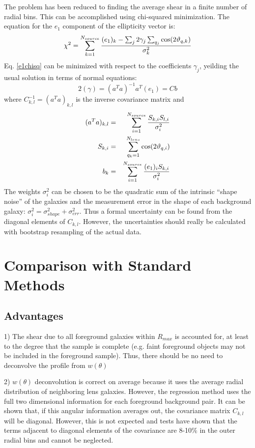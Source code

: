\documentclass[preprint2]{aastex}
\def\rmax{$R_{max}$ }
\begin{document}
The problem has been reduced to finding the average
shear in a finite number of radial bins.  This can be accomplished using
chi-squared minimization. The equation for the $e_1$ component of the ellipticity
vector is:
\begin{equation} \label{e1chisq}
\chi^{2} = \sum_{k=1}^{N_{source}}{(e_{1})_k - \sum_j2\gamma_j\sum_{q_j}\cos(2\vartheta_{q,k}) \over \sigma_k^{2}}
\end{equation}
Eq. \ref{e1chisq} can be minimized with respect to the coefficients
$\gamma_j$, yeilding the usual solution in terms of normal equations:
\begin{equation}
2(\gamma) = (a^{T}a)^{-1}a^{T}(e_{1}) = Cb
\end{equation}
where $C_{k,l}^{-1} = (a^{T}a)_{k,l}$ is the inverse covariance matrix and 
\begin{eqnarray}
(a^{T}a)_{k,l} & = & {\sum_{i=1}^{N_{source}}{S_{k,i}S_{l,i} \over
\sigma_{i}^{2} } } \nonumber \\
S_{k,i} & = & {\sum_{q_k=1}^{N_{lens}}\cos(2\vartheta_{q,i})}  \\
b_k & = & \sum_{i=1}^{N_{source}}{(e_{1})_{i}S_{k,i} \over \sigma_{i}^{2}} \nonumber
\end{eqnarray}
The weights $\sigma_{i}^{2}$ can be chosen to be the quadratic sum of the 
intrinsic ``shape noise'' of the galaxies and the measurement error in the 
shape of each background galaxy: 
$\sigma_{i}^{2} = \sigma_{shape}^{2} + \sigma_{err}^{2}$.
Thus a formal uncertainty can be found from the diagonal elements of
$C_{k,l}$.  However, the uncertainties should really be calculated with
bootstrap resampling of the actual data.

\section{Comparison with Standard Methods}
\subsection{Advantages}
1) The shear due to all foreground galaxies within \rmax is accounted for,
   at least to the degree that the sample is complete (e.g. faint foreground
   objects may not be included in the foreground sample).  Thus, there should 
   be no need to deconvolve the profile from $w(\theta)$

2) $w(\theta)$ deconvolution is correct on average because it uses the average
   radial distribution of neighboring lens galaxies.  However, the regression
   method uses the full two dimensional information for each foreground
   background pair.  It can be shown that, if this angular information averages
   out, the covariance matrix $C_{k,l}$ will be diagonal.  However, this is not
   expected and tests have shown that the terms adjacent to diagonal elements
   of the covariance are 8-10\% in the outer radial bins and cannot be
   neglected.
\end{document}
